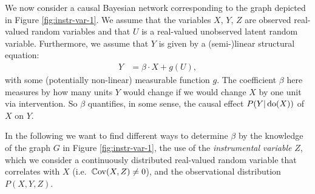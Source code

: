 We now consider a causal Bayesian network corresponding to the graph depicted in Figure \ref{fig:instr-var-1}. We assume that the variables $X$, $Y$, $Z$ are observed real-valued random variables and that $U$ is a real-valued unobserved latent random variable.
Furthermore, we assume that $Y$ is given by a (semi-)linear structural equation:
\begin{align*}
    Y &=  \beta \cdot X + g(U),
\end{align*}
with some (potentially non-linear) measurable function $g$.
The coefficient $\beta$ here measures by how many units $Y$ would change if we would change $X$ by one unit via intervention. So $\beta$ quantifies, in some sense, the causal effect $P(Y|\operatorname{do}(X))$ of $X$ on $Y$.

In the following we want to find different ways to determine $\beta$ by the knowledge of the graph $G$ in Figure \ref{fig:instr-var-1}, the use of the \emph{instrumental variable} $Z$, which we consider a continuously distributed real-valued random variable that correlates with $X$ (i.e.\ $\mathbb{C}\mathrm{ov}(X,Z) \neq 0$), and the observational distribution $P(X,Y,Z)$.

